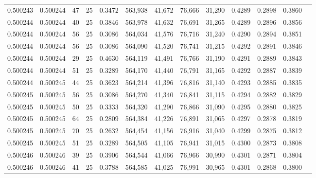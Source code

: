 \begin{tabular}{rrrrrrrrrrrrr}
0.500243 & 0.500244 &    47 &  25 &                                     0.3472 & 563,938 &  41,672 &  76,666 &  31,290 & 0.4289 & 0.2898 & 0.3860 \\
0.500244 & 0.500244 &    40 &  25 &                                     0.3846 & 563,978 &  41,632 &  76,691 &  31,265 & 0.4289 & 0.2896 & 0.3856 \\
0.500244 & 0.500244 &    56 &  25 &                                     0.3086 & 564,034 &  41,576 &  76,716 &  31,240 & 0.4290 & 0.2894 & 0.3851 \\
0.500244 & 0.500244 &    56 &  25 &                                     0.3086 & 564,090 &  41,520 &  76,741 &  31,215 & 0.4292 & 0.2891 & 0.3846 \\
0.500244 & 0.500244 &    29 &  25 &                                     0.4630 & 564,119 &  41,491 &  76,766 &  31,190 & 0.4291 & 0.2889 & 0.3843 \\
0.500244 & 0.500244 &    51 &  25 &                                     0.3289 & 564,170 &  41,440 &  76,791 &  31,165 & 0.4292 & 0.2887 & 0.3839 \\
0.500244 & 0.500245 &    44 &  25 &                                     0.3623 & 564,214 &  41,396 &  76,816 &  31,140 & 0.4293 & 0.2885 & 0.3835 \\
0.500245 & 0.500245 &    56 &  25 &                                     0.3086 & 564,270 &  41,340 &  76,841 &  31,115 & 0.4294 & 0.2882 & 0.3829 \\
0.500245 & 0.500245 &    50 &  25 &                                     0.3333 & 564,320 &  41,290 &  76,866 &  31,090 & 0.4295 & 0.2880 & 0.3825 \\
0.500245 & 0.500245 &    64 &  25 &                                     0.2809 & 564,384 &  41,226 &  76,891 &  31,065 & 0.4297 & 0.2878 & 0.3819 \\
0.500245 & 0.500245 &    70 &  25 &                                     0.2632 & 564,454 &  41,156 &  76,916 &  31,040 & 0.4299 & 0.2875 & 0.3812 \\
0.500245 & 0.500245 &    51 &  25 &                                     0.3289 & 564,505 &  41,105 &  76,941 &  31,015 & 0.4300 & 0.2873 & 0.3808 \\
0.500246 & 0.500246 &    39 &  25 &                                     0.3906 & 564,544 &  41,066 &  76,966 &  30,990 & 0.4301 & 0.2871 & 0.3804 \\
0.500246 & 0.500246 &    41 &  25 &                                     0.3788 & 564,585 &  41,025 &  76,991 &  30,965 & 0.4301 & 0.2868 & 0.3800 \\

\end{tabular}
